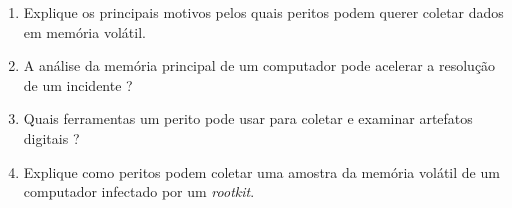     \begin{example} \label{cap3_exercicios}
        \begin{enumerate}
            \item Explique os principais motivos pelos quais peritos podem querer coletar dados em memória volátil.
            \item A análise da memória principal de um computador pode acelerar a resolução de um incidente ? 
            \item Quais ferramentas um perito pode usar para coletar e examinar artefatos digitais ?
            \item Explique como peritos podem coletar uma amostra da memória volátil de um computador infectado por um \textit{rootkit}.
        \end{enumerate}
    \end{example}

\newpage